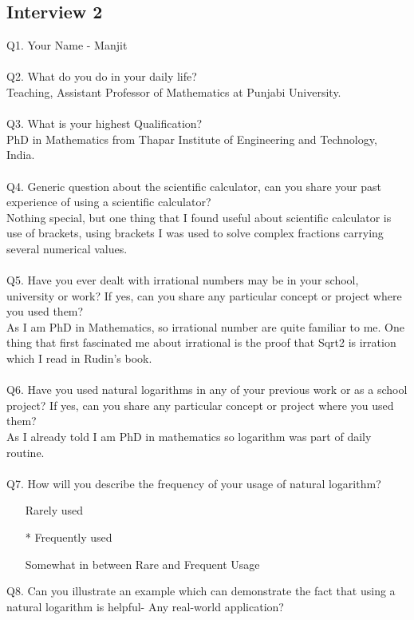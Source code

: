 \documentclass[12pt]{article}
\makeatletter
\newcommand*{\radiobutton}{%
  \@ifstar{\@radiobutton0}{\@radiobutton1}%
}
\newcommand*{\@radiobutton}[1]{%
  \begin{tikzpicture}
    \pgfmathsetlengthmacro\radius{height("X")/2}
    \draw[radius=\radius] circle;
    \ifcase#1 \fill[radius=.6*\radius] circle;\fi
  \end{tikzpicture}%
}
\makeatother
\begin{document}
\subsection{Interview 2}
Q1. Your Name -  Manjit\\\\
Q2. What do you do in your daily life?\\
Teaching, Assistant Professor of Mathematics at Punjabi University.\\\\
Q3. What is your highest Qualification?\\
PhD in Mathematics from Thapar Institute of Engineering and Technology, India.\\\\
Q4. Generic question about the scientific calculator, can you share your past experience of using a scientific calculator?\\
Nothing special, but one thing that I found useful about scientific calculator is use of brackets, using brackets I was used to solve complex fractions carrying several numerical values.\\\\
Q5. Have you ever dealt with irrational numbers may be in your school, university or work? If yes, can you share any particular concept or project where you used them?\\
As I am PhD in Mathematics, so irrational number are quite familiar to me. One thing that first fascinated me about irrational is the proof that Sqrt{2} is irration which I read in Rudin's book.\\\\
Q6. Have you used natural logarithms in any of your previous work or as a school project? If yes, can you share any particular concept or project where you used them?\\
As I already told I am PhD in mathematics so logarithm was part of daily routine.\\\\
Q7. How will you describe the frequency of your usage of natural logarithm?
\begin{itemize}
\item[\radiobutton] Rarely used
\item[\radiobutton*] Frequently used
\item[\radiobutton] Somewhat in between Rare and Frequent Usage
\end{itemize}
Q8. Can you illustrate an example which can demonstrate the fact that using a natural logarithm is helpful- Any real-world application?\\
\end{document}

